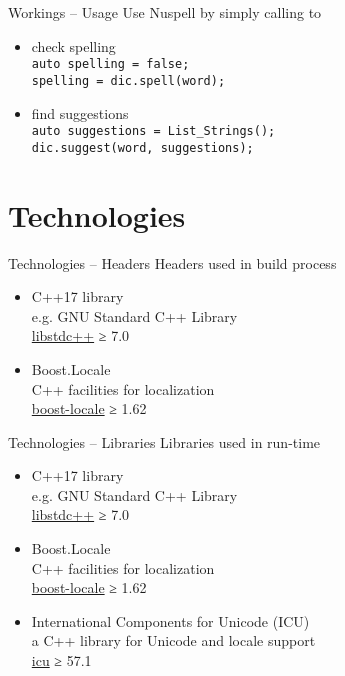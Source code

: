 \documentclass{beamer}
\begin{document}
\begin{frame}{Workings – Usage}
Use Nuspell by simply calling to\\\mbox{}
\begin{itemize}
\item check spelling\\
\texttt{auto spelling = false;\\
spelling = dic.\alert{spell}(word);}
\\\mbox{}
\item find suggestions\\
\texttt{auto suggestions = List\_Strings();\\
dic.\alert{suggest}(word, suggestions);}
\end{itemize}
\end{frame}



\section{Technologies}

\begin{frame}{Technologies – Headers}
Headers used in build process
\\\mbox{}
\begin{itemize}
\item C++17 library\\
e.g. GNU Standard C++ Library\\
\href{https://gcc.gnu.org/}{libstdc++} ≥ 7.0
\\\mbox{}
\item Boost.Locale\\
C++ facilities for localization\\
\href{https://www.boost.org/doc/libs/1_69_0/libs/locale/doc/html/index.html}{boost-locale} ≥ 1.62
\end{itemize}
\end{frame}

\begin{frame}{Technologies – Libraries}
Libraries used in run-time
\\\mbox{}
\begin{itemize}
\item C++17 library\\
e.g. GNU Standard C++ Library\\
\href{https://gcc.gnu.org/}{libstdc++} ≥ 7.0
\\\mbox{}
\item Boost.Locale\\
C++ facilities for localization\\
\href{https://www.boost.org/doc/libs/1_69_0/libs/locale/doc/html/index.html}{boost-locale} ≥ 1.62
\\\mbox{}
\item International Components for Unicode (ICU)\\
a C++ library for Unicode and locale support\\
\href{http://site.icu-project.org/}{icu} ≥ 57.1
\end{itemize}
\end{frame}
\end{document}
